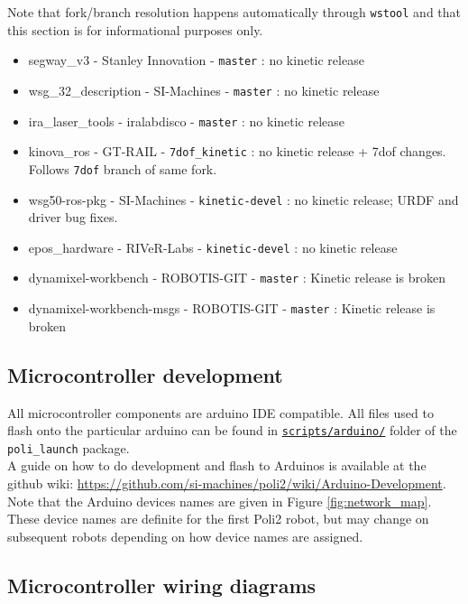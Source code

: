 Note that fork/branch resolution happens automatically through \texttt{wstool} and that this section is for informational purposes only.

\begin{itemize}
   \item segway\_v3 - Stanley Innovation - \texttt{master} : no kinetic release
   \item wsg\_32\_description - SI-Machines - \texttt{master} : no kinetic release
   \item ira\_laser\_tools - iralabdisco - \texttt{master} : no kinetic release
   \item kinova\_ros - GT-RAIL - \texttt{7dof\_kinetic} : no kinetic release + 7dof changes. Follows \texttt{7dof} branch of same fork.
   \item wsg50-ros-pkg - SI-Machines - \texttt{kinetic-devel} : no kinetic release; URDF and driver bug fixes.
   \item epos\_hardware - RIVeR-Labs - \texttt{kinetic-devel} : no kinetic release
   \item dynamixel-workbench - ROBOTIS-GIT - \texttt{master} : Kinetic release is broken
   \item dynamixel-workbench-msgs - ROBOTIS-GIT - \texttt{master} : Kinetic release is broken
\end{itemize}

\subsection{Microcontroller development}
All microcontroller components are arduino IDE compatible. 
All files used to flash onto the particular arduino can be found in \href{https://github.com/si-machines/poli2/tree/master/poli2_launch/scripts/arduino}{\texttt{scripts/arduino/}} folder of the \texttt{poli\_launch} package. \\

A guide on how to do development and flash to Arduinos is available at the github wiki: \href{https://github.com/si-machines/poli2/wiki/Arduino-Development}{https://github.com/si-machines/poli2/wiki/Arduino-Development}. \\

Note that the Arduino devices names are given in Figure \ref{fig:network_map}. These device names are definite for the first Poli2 robot, but may change on subsequent robots depending on how device names are assigned.

\subsection{Microcontroller wiring diagrams}
